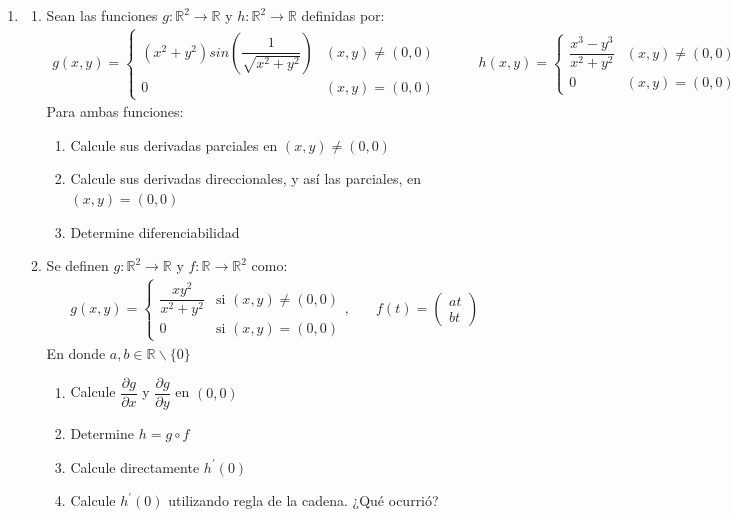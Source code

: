\documentclass[letterpaper,11pt]{article}
\begin{document}
\begin{enumerate}
\item 
\begin{enumerate}
    \item Sean las funciones $g:\mathbb{R}^2\rightarrow\mathbb{R}$ y $h:\mathbb{R}^2\rightarrow\mathbb{R}$ definidas por:
    \begin{align*}
        g(x,y)=\left\{\begin{matrix}
        (x^2+y^2)sin\left(\dfrac{1}{\sqrt{x^2+y^2}}\right)&  (x,y)\neq(0,0) \\
        0 & (x,y)=(0,0) 
        \end{matrix}\right. &\qquad 
        h(x,y)=\left\{\begin{matrix}
        \dfrac{x^3-y^3}{x^2+y^2}& (x,y)\neq(0,0) \\
        0 & (x,y)=(0,0) 
        \end{matrix}\right.
    \end{align*}
    Para ambas funciones:
    \begin{enumerate}
        \item Calcule sus derivadas parciales en $(x,y)\neq(0,0)$
        \item Calcule sus derivadas direccionales, y así las parciales, en $(x,y)=(0,0)$
        \item Determine diferenciabilidad 
    \end{enumerate}
     \item Se definen $g:\mathbb{R}^2\rightarrow\mathbb{R}$ y $f:\mathbb{R}\rightarrow\mathbb{R}^2$ como:
    \begin{align*}
        g(x,y)=\left\{\begin{matrix}
    \dfrac{xy^2}{x^2+y^2} & \text{si } (x,y)\neq(0,0)\\
    0 & \text{si }(x,y)=(0,0)
    \end{matrix}\right., &\quad f(t)=\begin{pmatrix}
    at\\
    bt
    \end{pmatrix}
    \end{align*}
    En donde $a,b\in\mathbb{R}\backslash\{0\}$
    \begin{enumerate}
        \item Calcule $\dfrac{\partial g}{\partial x}$ y $\dfrac{\partial g}{\partial y}$ en $(0,0)$
        \item Determine $h=g\circ f$
        \item Calcule directamente $h^{\prime}(0)$
        \item Calcule $h^{\prime}(0)$ utilizando regla de la cadena. ¿Qué ocurrió?
    \end{enumerate}
\end{enumerate}
\end{enumerate}
\newpage
\end{document}

